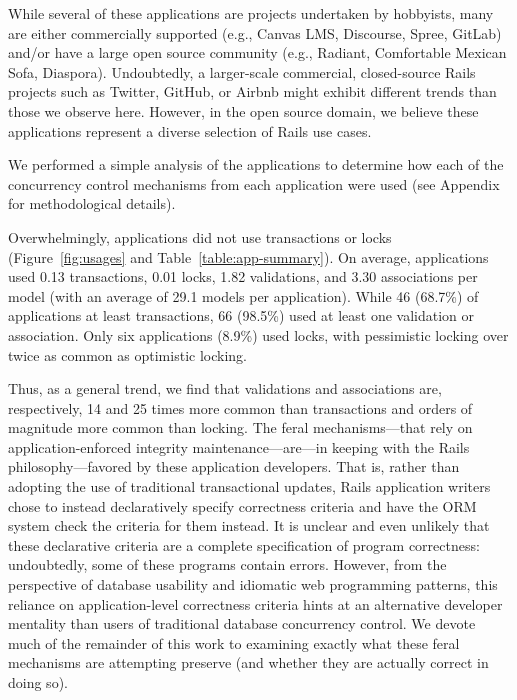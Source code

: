 While several of these applications are projects undertaken by
hobbyists, many are either commercially supported (e.g., Canvas LMS,
Discourse, Spree, GitLab) and/or have a large open source community
(e.g., Radiant, Comfortable Mexican Sofa, Diaspora). Undoubtedly, a
larger-scale commercial, closed-source Rails projects such as Twitter,
GitHub, or Airbnb might exhibit different trends than those we observe
here. However, in the open source domain, we believe these
applications represent a diverse selection of Rails use cases.

 We performed a simple analysis of the
applications to determine how each of the concurrency control
mechanisms from each application were used (see Appendix for
methodological details).

Overwhelmingly, applications did not use transactions or locks
(Figure~\ref{fig:usages} and Table~\ref{table:app-summary}). On
average, applications used 0.13 transactions, 0.01 locks, 1.82
validations, and 3.30 associations per model (with an average of 29.1
models per application). While 46 (68.7\%) of applications at least
transactions, 66 (98.5\%) used at least one validation or
association. Only six applications (8.9\%) used locks, with
pessimistic locking over twice as common as optimistic locking.

Thus, as a general trend, we find that validations and associations
are, respectively, 14 and 25 times more common than transactions and
orders of magnitude more common than locking. The feral
mechanisms---that rely on application-enforced integrity
maintenance---are---in keeping with the Rails philosophy---favored by
these application developers. That is, rather than adopting the use of
traditional transactional updates, Rails application writers chose to
instead declaratively specify correctness criteria and have the ORM
system check the criteria for them instead. It is unclear and even
unlikely that these declarative criteria are a complete specification
of program correctness: undoubtedly, some of these programs contain
errors. However, from the perspective of database usability and
idiomatic web programming patterns, this reliance on application-level
correctness criteria hints at an alternative developer mentality than
users of traditional database concurrency control.   We
devote much of the remainder of this work to examining exactly what
these feral mechanisms are attempting preserve (and whether they are
actually correct in doing so).

